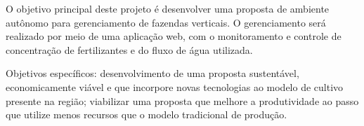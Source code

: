 O objetivo principal deste projeto é desenvolver uma proposta de ambiente autônomo para gerenciamento de fazendas verticais. O gerenciamento será realizado por meio de uma aplicação web, com o monitoramento e controle de concentração de fertilizantes e do fluxo de água utilizada.

Objetivos específicos: desenvolvimento de uma proposta sustentável, economicamente viável e que incorpore novas tecnologias ao modelo de cultivo presente na região; viabilizar uma proposta que melhore a produtividade ao passo que utilize menos recursos que o modelo tradicional de produção.